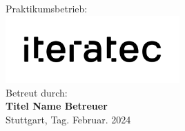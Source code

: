 \begin{titlepage}
\begin{center}
        \normalsize
        \vspace{0.8cm}
        Praktikumsbetrieb:\\ 
        \large
        \includegraphics[width=0.5\textwidth]{figures/iteratec-Logo.png}\\
        \vspace{0.3cm}
        \normalsize
        Betreut durch:\> \\ 
        \large
        \textbf{Titel Name Betreuer} \\
        \normalsize
        \vspace{0.5cm}
        Stuttgart, Tag. Februar. 2024\\
    \end{center}
\end{titlepage}